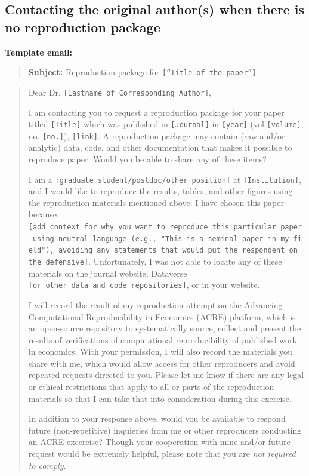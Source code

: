 \documentclass[]{book}
\begin{document}
\hypertarget{contacting-the-original-authors-when-there-is-no-reproduction-package}{%
\subsection{Contacting the original author(s) when there is no reproduction package}\label{contacting-the-original-authors-when-there-is-no-reproduction-package}}

\textbf{Template email:}

\begin{quote}
\textbf{Subject:} Reproduction package for \texttt{{[}“Title\ of\ the\ paper”{]}}
\end{quote}

\begin{quote}
Dear Dr. \texttt{{[}Lastname\ of\ Corresponding\ Author{]}},

I am contacting you to request a reproduction package for your paper titled \texttt{{[}Title{]}} which was published in \texttt{{[}Journal{]}} in \texttt{{[}year{]}} (vol \texttt{{[}volume{]}}, no. \texttt{{[}no.{]}}), \texttt{{[}link{]}}. A reproduction package may contain (raw and/or analytic) data, code, and other documentation that makes it possible to reproduce paper. Would you be able to share any of these items?

I am a \texttt{{[}graduate\ student/postdoc/other\ position{]}} at \texttt{{[}Institution{]}}, and I would like to reproduce the results, tables, and other figures using the reproduction materials mentioned above. I have chosen this paper because \texttt{{[}add\ context\ for\ why\ you\ want\ to\ reproduce\ this\ particular\ paper\ using\ neutral\ language\ (e.g.,\ "This\ is\ a\ seminal\ paper\ in\ my\ field"),\ avoiding\ any\ statements\ that\ would\ put\ the\ respondent\ on\ the\ defensive{]}}. Unfortunately, I was not able to locate any of these materials on the journal website, Dataverse \texttt{{[}or\ other\ data\ and\ code\ repositories{]}}, or in your website.

I will record the result of my reproduction attempt on the Advancing Computational Reproducibility in Economics (ACRE) platform, which is an open-source repository to systematically source, collect and present the results of verifications of computational reproducibility of published work in economics. With your permission, I will also record the materials you share with me, which would allow access for other reproducers and avoid repeated requests directed to you. Please let me know if there are any legal or ethical restrictions that apply to all or parts of the reproduction materials so that I can take that into consideration during this exercise.

In addition to your response above, would you be available to respond future (non-repetitive) inquieries from me or other reproducers conducting an ACRE excercise? Though your cooperation with mine and/or future request would be extremely helpful, please note that you are \emph{not required to comply}.
\end{quote}
\end{document}
